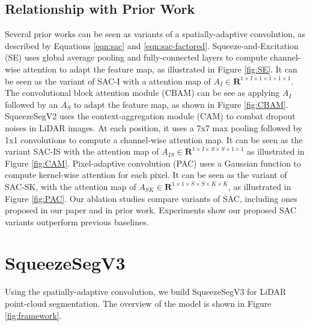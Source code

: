 \documentclass[runningheads]{llncs}
\begin{document}
\subsection{Relationship with Prior Work}
Several prior works can be seen as variants of a spatially-adaptive convolution, as described by Equations \ref{eqn:sac} and \ref{eqn:sac-factored}.
Squeeze-and-Excitation (SE) \cite{hu2018squeeze,hu2018gather} uses global average pooling and fully-connected layers to compute channel-wise attention to adapt the feature map, as illustrated in Figure \ref{fig:SE}. It can be seen as the variant of SAC-I with a attention map of $A_I \in \mathbf{R}^{1\times I \times 1 \times 1 \times 1 \times 1}$. The convolutional block attention module (CBAM) \cite{woo2018cbam} can be see as applying $A_I$ followed by an $A_S$ to adapt the feature map, as shown in Figure \ref{fig:CBAM}. SqueezeSegV2 \cite{wu2018squeezesegv2} uses the context-aggregation module (CAM) to combat dropout noises in LiDAR images. At each position, it uses a 7x7 max pooling followed by 1x1 convolutions to compute a channel-wise attention map. It can be seen as the variant SAC-IS with the attention map of $A_{IS} \in \mathbf{R}^{1\times I\times S\times S\times 1 \times 1}$ as illustrated in Figure \ref{fig:CAM}. Pixel-adaptive convolution (PAC) \cite{su2019pixel} uses a Gaussian function to compute kernel-wise attention for each pixel. It can be seen as the variant of SAC-SK, with the attention map of $A_{SK} \in \mathbf{R}^{1\times 1\times S\times S\times K \times K}$, as illustrated in Figure \ref{fig:PAC}. Our ablation studies compare variants of SAC, including ones proposed in our paper and in prior work. Experiments show our proposed SAC variants outperform previous baselines. 

























\section{SqueezeSegV3}

Using the spatially-adaptive convolution, we build SqueezeSegV3 for LiDAR point-cloud segmentation. The overview of the model is shown in Figure \ref{fig:framework}. 
\end{document}
